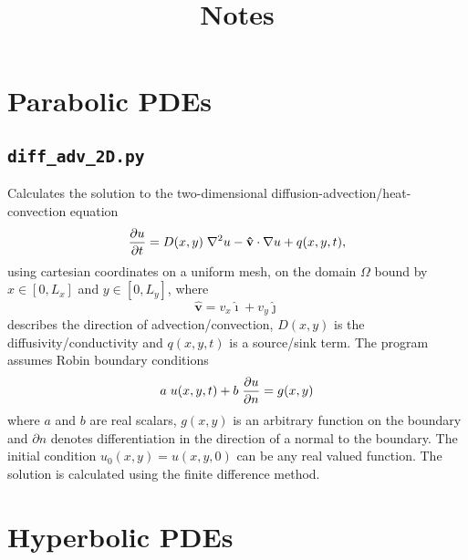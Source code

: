 \documentclass{article}
\begin{document}
\title{Notes}

\section{Parabolic PDEs}

\subsection{\texttt{diff\_adv\_2D.py}} 

Calculates the solution to the two-dimensional diffusion-advection/heat-convection equation
\begin{equation*}
\frac{\partial u}{\partial t} = D(x,y) \hspace{0.1cm} \nabla^{2} u  - \mathbf{\hat{v}} \cdot \nabla u + q(x,y,t),
\end{equation*}
using cartesian coordinates on a uniform mesh, on the domain $\Omega$ bound by $x \in [0,L_x]$ and $y \in [0,L_y]$, where
\begin{equation*}
\mathbf{\hat{v}} = v_x \mathbf{\hat{\imath}} + v_y \mathbf{\hat{\jmath}}
\end{equation*}
describes the direction of advection/convection, $D(x,y)$ is the diffusivity/conductivity and $q(x,y,t)$ is a source/sink term. The program assumes Robin boundary conditions
\begin{equation*}
a \hspace{0.1cm} u(x,y,t) + b \hspace{0.1cm} \frac{\partial u}{\partial n} = g(x,y)
\end{equation*}
where $a$ and $b$ are real scalars, $g(x,y)$ is an arbitrary function on the boundary and $\partial n$ denotes differentiation in the direction of a normal to the boundary. The initial condition $u_0(x,y)=u(x,y,0)$ can be any real valued function. The solution is calculated using the finite difference method.

\section{Hyperbolic PDEs}
\end{document}
